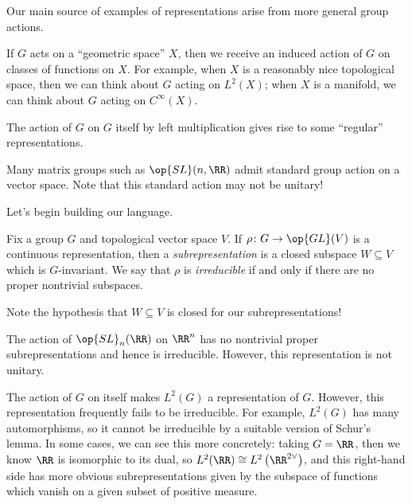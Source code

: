 \documentclass[../notes.tex]{subfiles}
\begin{document}
Our main source of examples of representations arise from more general group actions.
\begin{example}
	If $G$ acts on a ``geometric space'' $X$, then we receive an induced action of $G$ on classes of functions on $X$. For example, when $X$ is a reasonably nice topological space, then we can think about $G$ acting on $L^2(X)$; when $X$ is a manifold, we can think about $G$ acting on $C^\infty(X)$.
\end{example}
\begin{example}
	The action of $G$ on $G$ itself by left multiplication gives rise to some ``regular'' representations.
\end{example}
\begin{example}
	Many matrix groups such as $\op{SL}(n,\RR)$ admit standard group action on a vector space. Note that this standard action may not be unitary!
\end{example}
Let's begin building our language.
\begin{defihelper}  
	Fix a group $G$ and topological vector space $V$. If $\rho\colon G\to\op{GL}(V)$ is a continuous representation, then a \textit{subrepresentation} is a closed subspace $W\subseteq V$ which is $G$-invariant. We say that $\rho$ is \textit{irreducible} if and only if there are no proper nontrivial subspaces.
\end{defihelper}
Note the hypothesis that $W\subseteq V$ is closed for our subrepresentations!
\begin{example}
	The action of $\op{SL}_n(\RR)$ on $\RR^n$ has no nontrivial proper subrepresentations and hence is irreducible. However, this representation is not unitary.
\end{example}
\begin{remark}
	The action of $G$ on itself makes $L^2(G)$ a representation of $G$. However, this representation frequently fails to be irreducible. For example, $L^2(G)$ has many automorphisms, so it cannot be irreducible by a suitable version of Schur's lemma. In some cases, we can see this more concretely: taking $G=\RR$, then we know $\RR$ is isomorphic to its dual, so $L^2(\RR)\cong L^2\left(\RR^{2\lor}\right)$, and this right-hand side has more obvious subrepresentations given by the subspace of functions which vanish on a given subset of positive measure.
\end{remark}
\end{document}
